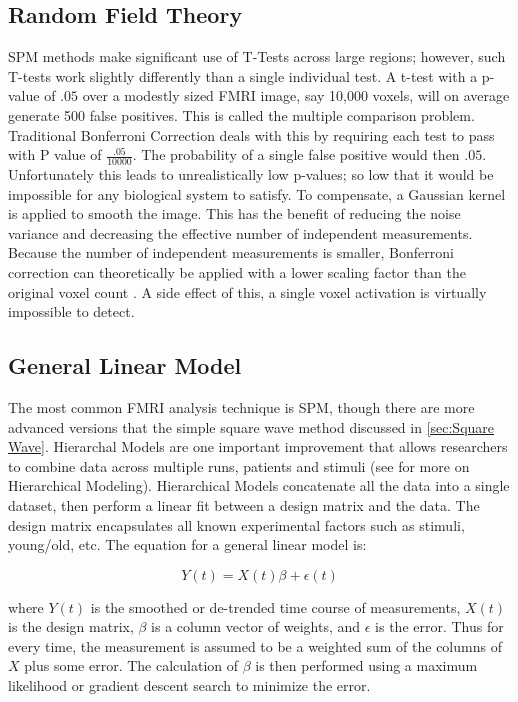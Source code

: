 \subsection{Random Field Theory}
\label{sec:RFT}
SPM methods make significant use of T-Tests across large regions;
however, such T-tests work slightly differently than a single
individual test. A t-test with a p-value of $.05$ over a modestly sized FMRI image,
say 10,000 voxels, will on average generate 500 false
positives. This is called the multiple comparison problem. Traditional
Bonferroni Correction
deals with this by requiring each test to pass with P
value of $\frac{.05}{10000}$. The probability of 
a single false positive would then $.05$. Unfortunately this leads to unrealistically
low p-values; so low that it would be impossible for any biological system to satisfy. To
compensate, a Gaussian kernel is applied to smooth the image. This has
the benefit of reducing the noise variance and 
decreasing the effective number of independent measurements. Because
the number of independent measurements is smaller, Bonferroni correction
can theoretically be applied with a lower scaling factor than
the original voxel count \cite{Worsley2004}. A side effect of this,
a single voxel activation is virtually impossible to detect.

\subsection{General Linear Model}
\label{sec:Current Techniques General Linear Model}
The most common FMRI analysis technique is SPM, though there
are more advanced versions that the simple square wave
method discussed in \autoref{sec:Square Wave}. Hierarchal
Models are one important improvement that allows researchers
to combine data across multiple runs, patients and stimuli
(see \cite{Hofmann1997} for more on Hierarchical Modeling). 
Hierarchical Models
concatenate all the data into a single dataset, then perform
a linear fit between a design matrix and the data. The design matrix
encapsulates all known experimental factors such as stimuli,
young/old, etc.  The equation for a general linear model is:

\begin{equation}
Y(t) = X(t)\beta + \epsilon(t)
\end{equation}

where $Y(t)$ is the smoothed or de-trended time course of measurements,
$X(t)$ is the design matrix, $\beta$ is a column vector of weights,
and $\epsilon$ is the error. Thus for every time, the measurement is
assumed to be a weighted sum of the columns of $X$ plus some error. The calculation
of $\beta$ is then performed using a maximum likelihood or gradient descent search 
to minimize the error. 

